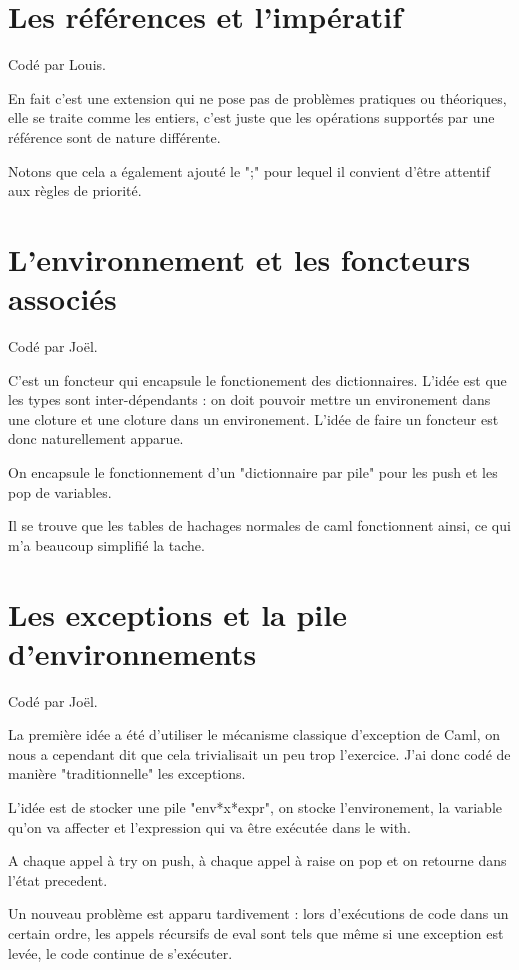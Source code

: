 \documentclass[a4paper,10pt]{report}
\begin{document}
\section{Les références et l'impératif}  
Codé par Louis.  
  
En fait c'est une extension qui ne pose pas de problèmes pratiques ou théoriques, elle se traite comme les entiers, c'est juste que les opérations supportés par une référence sont de nature différente.  
  
Notons que cela a également ajouté le ";" pour lequel il convient d'être attentif aux règles de priorité.  

\section{L'environnement et les foncteurs associés}  
Codé par Joël.

C'est un foncteur qui encapsule le fonctionement des dictionnaires. L'idée est que les types sont inter-dépendants : on doit pouvoir mettre un environement dans une cloture et une cloture dans un environement. L'idée de faire un foncteur est donc naturellement apparue.

On encapsule le fonctionnement d'un "dictionnaire par pile" pour les push et les pop de variables.

Il se trouve que les tables de hachages normales de caml fonctionnent ainsi, ce qui m'a beaucoup simplifié la tache.

\section{Les exceptions et la pile d'environnements}  
Codé par Joël.

La première idée a été d'utiliser le mécanisme classique d'exception de Caml, on nous a cependant dit que cela trivialisait un peu trop l'exercice. J'ai donc codé de manière "traditionnelle" les exceptions.

L'idée est de stocker une pile "env*x*expr", on stocke l'environement, la variable qu'on va affecter et l'expression qui va être exécutée dans le with.

A chaque appel à try on push, à chaque appel à raise on pop et on retourne dans l'état precedent.

Un nouveau problème est apparu tardivement : lors d'exécutions de code dans un certain ordre, les appels récursifs de eval sont tels que même si une exception est levée, le code continue de s'exécuter.
\end{document}
